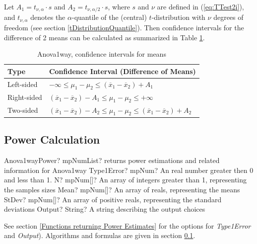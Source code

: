 \vspace{0.3cm}
Let $A_1=t_{\nu,\alpha} \cdot s$ and $A_2=t_{\nu,\alpha/2} \cdot s$, where $s$ and $\nu$ are defined in (\ref{eq:TTest2i}), and $t_{\nu,\alpha}$ denotes the $\alpha$-quantile of the (central) $t$-distribution with $\nu$ degrees of freedom (see section \ref{tDistributionQuantile}). Then confidence intervals for the difference of 2 means can be calculated as summarized in Table \ref{Anova1way, CI}.

\begin{table}[ht]
	\centering
	\begin{tabular}{|l|l|}
		\hline
		Type & Confidence Interval (Difference of Means)\\
		\hline
		Left-sided &  $-\infty \leq \mu_1 - \mu_2 \leq (\overline{x}_1-\overline{x}_2) + A_1$ \\
		Right-sided &  $(\overline{x}_1-\overline{x}_2) - A_1 \leq \mu_1 - \mu_2 \leq +\infty$\\
		Two-sided & $(\overline{x}_1-\overline{x}_2) - A_2 \leq \mu_1 - \mu_2 \leq (\overline{x}_1-\overline{x}_2) + A_2$ \\
		\hline
	\end{tabular}
	\caption{Anova1way, confidence intervals for means}
	\label{Anova1way, CI}
\end{table}


\subsection{Power Calculation}
\label{Anova1way_Power}


\begin{mpFunctionsExtract}
	\mpFunctionFiveNotImplemented
	{Anova1wayPower? mpNumList? returns power estimations and related information for Anova1way}
	{Type1Error? mpNum? An real number greater then 0 and less than 1.}
	{N? mpNum[]? An array of integers greater than 1, representing the samples sizes}
	{Mean? mpNum[]? An array of reals, representing the means}
	{StDev? mpNum[]? An array of positive reals, representing the standard deviations}
	{Output? String? A string describing the output choices}
\end{mpFunctionsExtract}

\vspace{0.3cm}
See section \ref{Functions returning Power Estimates} for the options for {\itshape\sffamily Type1Error} and {\itshape\sffamily Output}). Algorithms and formulas are given in section \ref{Anova1way_Power}.

